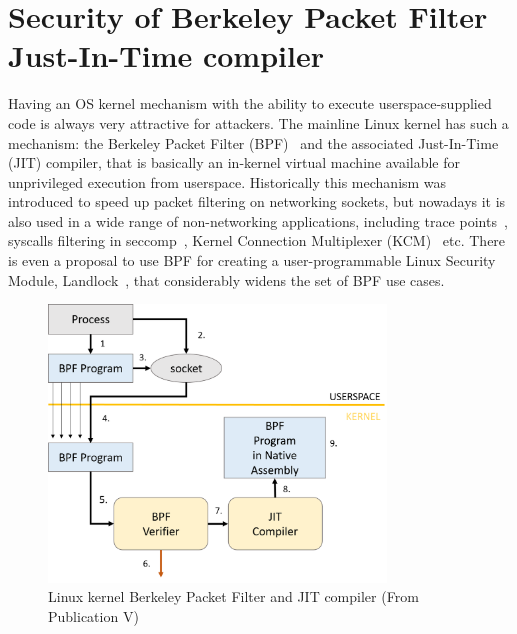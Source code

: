 \section{Security of Berkeley Packet Filter Just-In-Time compiler}
\label{sec:bpf-jit-attack}

Having an OS kernel mechanism with the ability to execute userspace-supplied code is always very attractive for attackers. 
The mainline Linux kernel has such a mechanism: the Berkeley Packet Filter (BPF)~\cite{kernelfilter2016} and the associated Just-In-Time (JIT) compiler, that is basically an in-kernel virtual machine available for unprivileged execution from userspace. Historically this mechanism was introduced to speed up packet filtering on networking sockets, but nowadays it is also used in a wide range of non-networking applications, including trace points~\cite{starovoitov2015}, syscalls filtering in seccomp~\cite{seccomp2016}, Kernel Connection Multiplexer (KCM)~\cite{corbet2015} etc. There is even a proposal to use BPF for creating a user-programmable Linux Security Module, Landlock~\cite{landlock2016}, that considerably widens the set of BPF use cases.

\begin{figure}[t]
	\centering
		\includegraphics[width=0.80\textwidth]{figures/bpf-overview.png}
	\caption{Linux kernel Berkeley Packet Filter and JIT compiler (From Publication V)}
	\label{fig:bpf-overview}
\end{figure}



